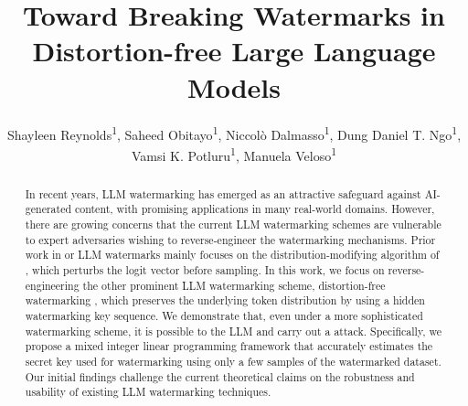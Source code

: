 \documentclass[letterpaper]{article}
\title{Toward Breaking Watermarks in Distortion-free Large Language Models}
\author {
    Shayleen Reynolds\textsuperscript{\rm 1},
    Saheed Obitayo\textsuperscript{\rm 1},
    Niccol\`o Dalmasso\textsuperscript{\rm 1},
    Dung Daniel T. Ngo\textsuperscript{\rm 1},\\
    Vamsi K. Potluru\textsuperscript{\rm 1},
    Manuela Veloso\textsuperscript{\rm 1}
}
\date{}
\begin{document}
%
\maketitle
%
\begin{abstract}
In recent years, LLM watermarking has emerged as an attractive safeguard against AI-generated content, with promising applications in many real-world domains. However, there are growing concerns that the current LLM watermarking schemes are vulnerable to expert adversaries wishing to reverse-engineer the watermarking mechanisms. Prior work in  or  LLM watermarks mainly focuses on the distribution-modifying algorithm of \citet{kirchenbauer2023watermark}, which perturbs the logit vector before sampling. In this work, we focus on reverse-engineering the other prominent LLM watermarking scheme, distortion-free watermarking \citep{kuditipudi2024robust}, which preserves the underlying token distribution by using a hidden watermarking key sequence. We demonstrate that, even under a more sophisticated watermarking scheme, it is possible to  the LLM and carry out a  attack. Specifically, we propose a mixed integer linear programming framework that accurately estimates the secret key used for watermarking using only a few samples of the watermarked dataset. Our initial findings challenge the current theoretical claims on the robustness and usability of existing LLM watermarking techniques.
\end{abstract}
%

%

%
% 
%
% 
% 



\end{document}
